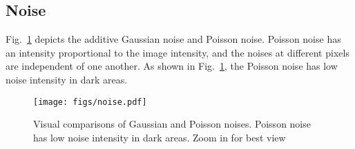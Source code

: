 \documentclass[10pt,twocolumn,letterpaper]{article}
\begin{document}
\subsection{Noise}
Fig.~\ref{fig:noise} depicts the additive Gaussian noise and Poisson noise.
Poisson noise has an intensity proportional to the image intensity, and the noises at different pixels are independent of one another.
As shown in Fig.~\ref{fig:noise}, the Poisson noise has low noise intensity in dark areas.

\begin{figure}[h]
\begin{center}
\texttt{[image: figs/noise.pdf]}
	\end{center}
	\vspace{-0.5cm}
	\caption{Visual comparisons of Gaussian and Poisson noises. Poisson noise has low noise intensity in dark areas. Zoom in for best view}
	\label{fig:noise}
\end{figure}
\end{document}
